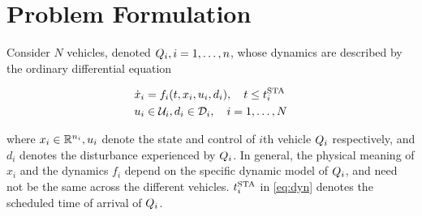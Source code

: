 \section{Problem Formulation \label{sec:formulation}}
Consider $N$ vehicles, denoted $Q_i, i = 1,\ldots,n$, whose dynamics are described by the ordinary differential equation

\begin{equation}
\label{eq:dyn}
\begin{aligned}
\dot{x}_i &= f_i(t, x_i, u_i, d_i), \quad t \le t^\text{STA}_i \\
u_i &\in \mathcal{U}_i, d_i \in \mathcal{D}_i, \quad i = 1,\ldots, N
\end{aligned}
\end{equation}

\noindent where $x_i \in \mathbb{R}^{n_i}, u_i$ denote the state and control of $i$th vehicle $Q_i$ respectively, and $d_i$ denotes the disturbance experienced by $Q_i$. In general, the physical meaning of $x_i$ and the dynamics $f_i$ depend on the specific dynamic model of $Q_i$, and need not be the same across the different vehicles. $t^\text{STA}_i$ in \eqref{eq:dyn} denotes the scheduled time of arrival of $Q_i$. 


